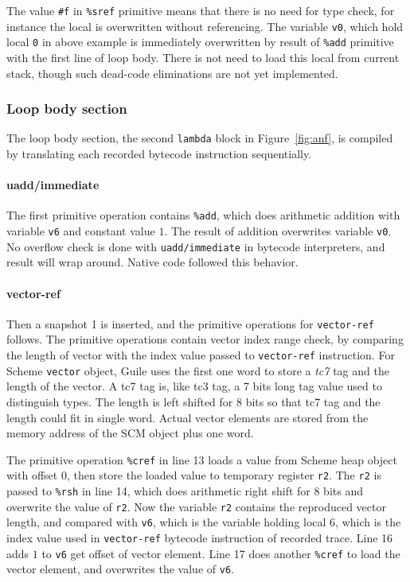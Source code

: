 \documentclass[preprint, 10pt]{sigplanconf}
\begin{document}
The value \texttt{\#f} in \texttt{\%sref} primitive means that there is no
need for type check, for instance the local is overwritten without
referencing. The variable \texttt{v0}, which hold local \texttt{0} in above
example is immediately overwritten by result of \texttt{\%add} primitive with
the first line of loop body. There is not need to load this local from current
stack, though such dead-code eliminations are not yet implemented.

\subsubsection{Loop body section}

The loop body section, the second \texttt{lambda} block in
Figure~\hyperref[fig:anf]{\ref{fig:anf}}, is compiled by translating each
recorded bytecode instruction sequentially.

\paragraph{uadd/immediate} The first primitive operation contains
\texttt{\%add}, which does arithmetic addition with variable \texttt{v6} and
constant value $1$. The result of addition overwrites variable \texttt{v0}. No
overflow check is done with \texttt{uadd/immediate} in bytecode interpreters,
and result will wrap around. Native code followed this behavior.

\paragraph{vector-ref} Then a snapshot 1 is inserted, and
the primitive operations for \texttt{vector-ref} follows. The primitive
operations contain vector index range check, by comparing the length of vector
with the index value passed to \texttt{vector-ref} instruction. For Scheme
\texttt{vector} object, Guile uses the first one word to store a \textit{tc7}
tag and the length of the vector. A tc7 tag is, like tc3 tag, a 7 bits long
tag value used to distinguish types. The length is left shifted for 8 bits so
that tc7 tag and the length could fit in single word. Actual vector elements
are stored from the memory address of the SCM object plus one word.

The primitive operation \texttt{\%cref} in line 13 loads a value from Scheme
heap object with offset 0, then store the loaded value to temporary register
\texttt{r2}. The \texttt{r2} is passed to \texttt{\%rsh} in line 14, which
does arithmetic right shift for 8 bits and overwrite the value of
\texttt{r2}. Now the variable \texttt{r2} contains the reproduced vector
length, and compared with \texttt{v6}, which is the variable holding local 6,
which is the index value used in \texttt{vector-ref} bytecode instruction of
recorded trace. Line 16 adds $1$ to \texttt{v6} get offset of vector
element. Line 17 does another \texttt{\%cref} to load the vector element, and
overwrites the value of \texttt{v6}.
\end{document}
